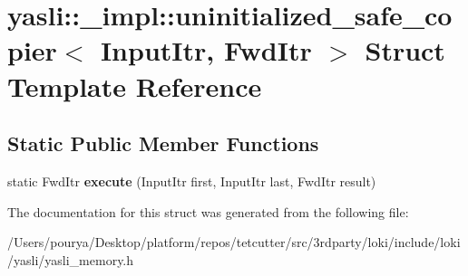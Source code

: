 \hypertarget{structyasli_1_1__impl_1_1uninitialized__safe__copier}{}\section{yasli\+:\+:\+\_\+impl\+:\+:uninitialized\+\_\+safe\+\_\+copier$<$ Input\+Itr, Fwd\+Itr $>$ Struct Template Reference}
\label{structyasli_1_1__impl_1_1uninitialized__safe__copier}
\subsection*{Static Public Member Functions}
\begin{DoxyCompactItemize}
\item 
\hypertarget{structyasli_1_1__impl_1_1uninitialized__safe__copier_a67dbca7c20cda27abe5715020c7760fd}{}static Fwd\+Itr {\bfseries execute} (Input\+Itr first, Input\+Itr last, Fwd\+Itr result)\label{structyasli_1_1__impl_1_1uninitialized__safe__copier_a67dbca7c20cda27abe5715020c7760fd}

\end{DoxyCompactItemize}


The documentation for this struct was generated from the following file\+:\begin{DoxyCompactItemize}
\item 
/\+Users/pourya/\+Desktop/platform/repos/tetcutter/src/3rdparty/loki/include/loki/yasli/yasli\+\_\+memory.\+h\end{DoxyCompactItemize}

